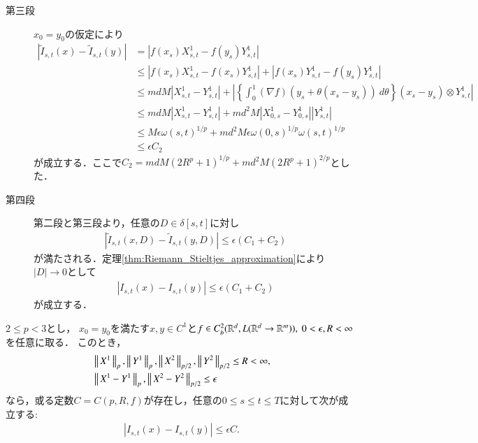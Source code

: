 \begin{prf}
\begin{description}
			\item[第三段]
				$x_0 = y_0$の仮定により
				\begin{align}
					\left| \tilde{I}_{s,t}(x) - \tilde{I}_{s,t}(y) \right|
					&= \left| f(x_s)X^1_{s,t} - f(y_s)Y^1_{s,t} \right| \\
					&\leq \left| f(x_s)X^1_{s,t} - f(x_s)Y^1_{s,t} \right|
						+ \left| f(x_s)Y^1_{s,t} - f(y_s)Y^1_{s,t} \right| \\
					&\leq mdM \left| X^1_{s,t} - Y^1_{s,t} \right|
						+ \left| \left\{ \int_0^1 (\nabla f)(y_s + \theta(x_s - y_s))\ d\theta \right\}
						(x_s - y_s) \otimes Y^1_{s,t} \right| \\
					&\leq mdM \left| X^1_{s,t} - Y^1_{s,t} \right|
						+ m d^2 M \left| X^1_{0,s} - Y^1_{0,s}\right| \left| Y^1_{s,t} \right| \\
					&\leq M \epsilon \omega(s,t)^{1/p} + m d^2 M \epsilon \omega(0,s)^{1/p} \omega(s,t)^{1/p} \\
					&\leq \epsilon C_2 
				\end{align}
				が成立する．ここで$C_2 = mdM \left( 2 R^p + 1 \right)^{1/p} + m d^2 M \left( 2 R^p + 1 \right)^{2/p}$とした．
				
			\item[第四段]
				第二段と第三段より，任意の$D \in \delta[s,t]$に対し
				\begin{align}
					\left| \tilde{I}_{s,t}(x,D) - \tilde{I}_{s,t}(y,D) \right|
					\leq \epsilon (C_1 + C_2)
				\end{align}
				が満たされる．定理\ref{thm:Riemann_Stieltjes_approximation}により
				$|D| \longrightarrow 0$として
				\begin{align}
					\left| I_{s,t}(x) - I_{s,t}(y) \right|
					\leq \epsilon (C_1 + C_2)
				\end{align}
				が成立する．
				\QED
		\end{description}
	\end{prf}
	
	\begin{screen}
		\begin{thm}\label{thm:continuity_theorem_2}
			$2 \leq p < 3$とし，
			$x_0 = y_0$を満たす$x,y \in C^1$と$f \in C^2_b(\mathbb{R}^d,L(\mathbb{R}^d \rightarrow \mathbb{R}^m)),\ 0 < \epsilon, R < \infty$を任意に取る．
			このとき，
			\begin{align}
				&\left\|\, X^1\, \right\|_{p},\left\|\, Y^1\, \right\|_{p},\left\|\, X^2\, \right\|_{p/2},\left\|\, Y^2\, \right\|_{p/2} \leq R < \infty,\\
				&\left\|\, X^1 - Y^1\, \right\|_{p},\left\|\, X^2 - Y^2\, \right\|_{p/2} \leq \epsilon
			\end{align}
			なら，或る定数$C = C(p,R,f)$が存在し，任意の$0 \leq s \leq t \leq T$に対して次が成立する:
			\begin{align}
				\left| I_{s,t}(x) - I_{s,t}(y) \right| \leq \epsilon C.
			\end{align}
		\end{thm}
	\end{screen}
	
